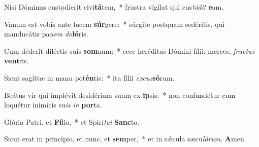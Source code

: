 
Nisi Dóminus custodíerit civi\textbf{tá}tem,~* frustra vígilat qui cus\textit{tó}\textit{dit} \textbf{e}am.

Vanum est vobis ante lucem \textbf{súr}gere:~* súrgite postquam sedéritis, qui manducátis pa\textit{nem} \textit{do}\textbf{ló}ris.

Cum déderit diléctis suis \textbf{som}num:~* ecce heréditas Dómini fílii: merces, \textit{fruc}\textit{tus} \textbf{ven}tris.

Sicut sagíttæ in manu pot\textbf{én}tis:~* ita fílii \textit{ex}\textit{cus}\textbf{só}rum.

Beátus vir qui implévit desidérium suum ex \textbf{ip}sis:~* non confundétur cum loquétur inimícis su\textit{is} \textit{in} \textbf{por}ta.

Glória Patri, et \textbf{Fí}lio,~* et Spirí\textit{tu}\textit{i} \textbf{Sanc}to.

Sicut erat in princípio, et nunc, et \textbf{sem}per,~* et in sǽcula sæcu\textit{ló}\textit{rum}. \textbf{A}men.

